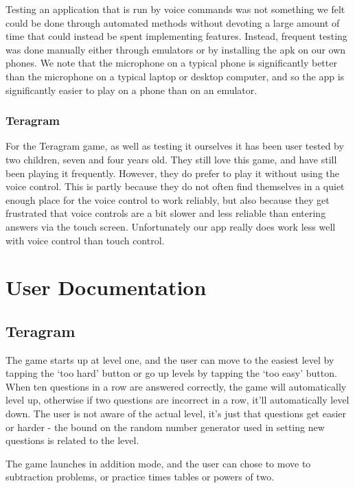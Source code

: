 \documentclass[11pt, oneside]{article}
\begin{document}
Testing an application that is run by voice commands was not something
we felt could be done through automated methods without devoting a
large amount of time that could instead be spent implementing
features. Instead, frequent testing was done manually either through
emulators or by installing the apk on our own phones. We note that the
microphone on a typical phone is significantly better than the
microphone on a typical laptop or desktop computer, and so the app is
significantly easier to play on a phone than on an emulator.

\subsubsection*{Teragram}

For the Teragram game, as well as testing it ourselves it has been
user tested by two children, seven and four years old. They still love
this game, and have still been playing it frequently.  However, they
do prefer to play it without using the voice control. This is partly
because they do not often find themselves in a quiet enough place for
the voice control to work reliably, but also because they get
frustrated that voice controls are a bit slower and less reliable than
entering answers via the touch screen. Unfortunately our app really
does work less well with voice control than touch control.

\pagebreak

\section{User Documentation}

\subsection{Teragram}

The game starts up at level one, and the user can move to the easiest
level by tapping the `too hard' button or go up levels by tapping the
`too easy' button. When ten questions in a row are answered correctly,
the game will automatically level up, otherwise if two questions are
incorrect in a row, it'll automatically level down.  The user is not
aware of the actual level, it's just that questions get easier or
harder - the bound on the random number generator used in setting new
questions is related to the level.

The game launches in addition mode, and the user can chose to move to
subtraction problems, or practice times tables or powers of two.
\end{document}
